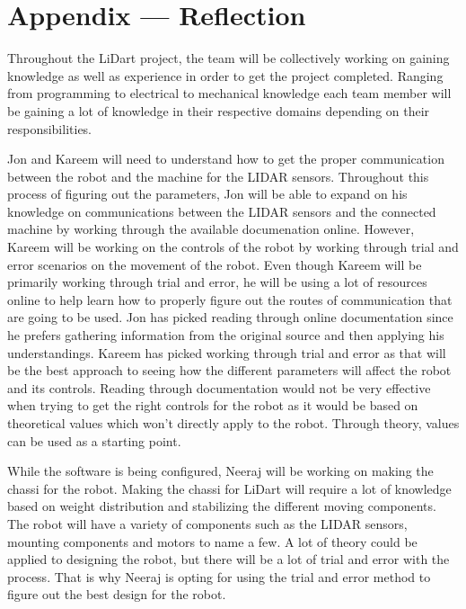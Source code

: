 \documentclass[12pt]{article}
\begin{document}
\newpage{}
\section*{Appendix --- Reflection}

	Throughout the LiDart project, the team will be collectively working on gaining knowledge as well as experience in order to get the project completed.  Ranging from programming to electrical to mechanical knowledge each team member will be gaining a lot of knowledge in their respective domains depending on their responsibilities.

Jon and Kareem will need to understand how to get the proper communication between the robot and the machine for the LIDAR sensors.
Throughout this process of figuring out the parameters, Jon will be able to expand on his knowledge on communications between the LIDAR sensors and the connected machine by working through the available documenation online. However, Kareem will be working on the controls of the robot by working through trial and error scenarios on the movement of the robot. Even though Kareem will be primarily working through trial and error, he will be using a lot of resources online to help learn how to properly figure out the routes of communication that are going to be used.
Jon has picked reading through online documentation since he prefers gathering information from the original source and then applying his understandings. Kareem has picked working through trial and error as that will be the best approach to seeing how the different parameters will affect the robot and its controls. Reading through documentation would not be very effective when trying to get the right controls for the robot as it would be based on theoretical values which won't directly apply to the robot. Through theory, values can be used as a starting point.

While the software is being configured, Neeraj will be working on making the chassi for the robot. Making the chassi for LiDart will require a lot of knowledge based on weight distribution and stabilizing the different moving components. The robot will have a variety of components such as the LIDAR sensors, mounting components and motors to name a few.
A lot of theory could be applied to designing the robot, but there will be a lot of trial and error with the process. That is why Neeraj is opting for using the trial and error method to figure out the best design for the robot. 
\end{document}
